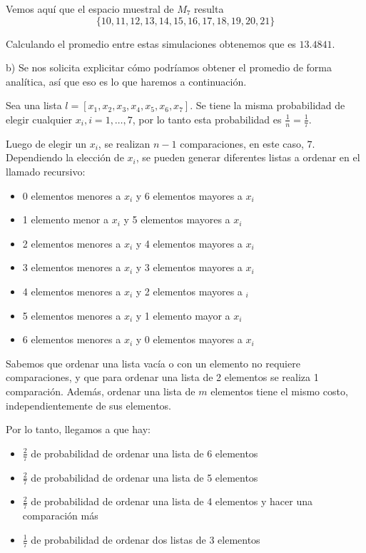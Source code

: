 \documentclass[11pt]{article}
\begin{document}
Vemos aquí que el espacio muestral de $M_7$ resulta 
$$\{10,11,12,13,14,15,16,17,18,19,20,21\}$$

Calculando el promedio entre estas simulaciones obtenemos que es $13.4841$.

b) Se nos solicita explicitar cómo podríamos obtener el promedio de forma analítica, así que eso es lo que haremos a continuación. 

Sea una lista $l = [x_1, x_2, x_3, x_4, x_5, x_6, x_7]$. Se tiene la misma probabilidad de elegir cualquier $x_i, i = 1, \dots ,7$, por lo tanto esta probabilidad es $\frac{1}{n} = \frac{1}{7}$.

Luego de elegir un $x_i$, se realizan $n-1$ comparaciones, en este caso, $7$. Dependiendo la elección de $x_i$, se pueden generar diferentes listas a ordenar en el llamado recursivo:

\begin{itemize}
    \item 0 elementos menores a $x_i$ y 6 elementos mayores a $x_i$
    \item 1 elemento menor a $x_i$ y 5 elementos mayores a $x_i$
    \item 2 elementos menores a $x_i$ y 4 elementos mayores a $x_i$
    \item 3 elementos menores a $x_i$ y 3 elementos mayores a $x_i$
    \item 4 elementos menores a $x_i$ y 2 elementos mayores a $_i$
    \item 5 elementos menores a $x_i$ y 1 elemento mayor a $x_i$
    \item 6 elementos menores a $x_i$ y 0 elementos mayores a $x_i$
\end{itemize}

Sabemos que ordenar una lista vacía o con un elemento no requiere comparaciones, y que para ordenar una lista de 2 elementos se realiza 1 comparación. Además, ordenar una lista de $m$ elementos tiene el mismo costo, independientemente de sus elementos.

Por lo tanto, llegamos a que hay:

\begin{itemize}
    \item $\frac{2}{7}$ de probabilidad de ordenar una lista de 6 elementos
    \item $\frac{2}{7}$ de probabilidad de ordenar una lista de 5 elementos
    \item $\frac{2}{7}$ de probabilidad de ordenar una lista de 4 elementos y hacer una comparación más
    \item $\frac{1}{7}$ de probabilidad de ordenar dos listas de 3 elementos
\end{itemize}
\end{document}
